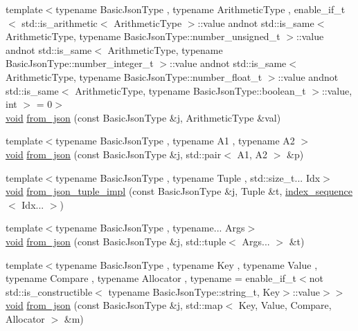 \begin{DoxyCompactItemize}
{\footnotesize template$<$typename Basic\+Json\+Type , typename Arithmetic\+Type , enable\+\_\+if\+\_\+t$<$ std\+::is\+\_\+arithmetic$<$ Arithmetic\+Type $>$\+::value andnot std\+::is\+\_\+same$<$ Arithmetic\+Type, typename Basic\+Json\+Type\+::number\+\_\+unsigned\+\_\+t $>$\+::value andnot std\+::is\+\_\+same$<$ Arithmetic\+Type, typename Basic\+Json\+Type\+::number\+\_\+integer\+\_\+t $>$\+::value andnot std\+::is\+\_\+same$<$ Arithmetic\+Type, typename Basic\+Json\+Type\+::number\+\_\+float\+\_\+t $>$\+::value andnot std\+::is\+\_\+same$<$ Arithmetic\+Type, typename Basic\+Json\+Type\+::boolean\+\_\+t $>$\+::value, int $>$  = 0$>$ }\\\hyperlink{namespacenlohmann_1_1detail_a59fca69799f6b9e366710cb9043aa77d}{void} \hyperlink{namespacenlohmann_1_1detail_a839b0ab50d2c9bce669068f56bc41202}{from\+\_\+json} (const Basic\+Json\+Type \&j, Arithmetic\+Type \&val)
\item 
{\footnotesize template$<$typename Basic\+Json\+Type , typename A1 , typename A2 $>$ }\\\hyperlink{namespacenlohmann_1_1detail_a59fca69799f6b9e366710cb9043aa77d}{void} \hyperlink{namespacenlohmann_1_1detail_aae9f9c2601074e323d49428132cc293d}{from\+\_\+json} (const Basic\+Json\+Type \&j, std\+::pair$<$ A1, A2 $>$ \&p)
\item 
{\footnotesize template$<$typename Basic\+Json\+Type , typename Tuple , std\+::size\+\_\+t... Idx$>$ }\\\hyperlink{namespacenlohmann_1_1detail_a59fca69799f6b9e366710cb9043aa77d}{void} \hyperlink{namespacenlohmann_1_1detail_a28253915d9db4a0112d60eaee0422949}{from\+\_\+json\+\_\+tuple\+\_\+impl} (const Basic\+Json\+Type \&j, Tuple \&t, \hyperlink{structnlohmann_1_1detail_1_1index__sequence}{index\+\_\+sequence}$<$ Idx... $>$)
\item 
{\footnotesize template$<$typename Basic\+Json\+Type , typename... Args$>$ }\\\hyperlink{namespacenlohmann_1_1detail_a59fca69799f6b9e366710cb9043aa77d}{void} \hyperlink{namespacenlohmann_1_1detail_a8b99ec9b29f3f20a18fc4281fb784e49}{from\+\_\+json} (const Basic\+Json\+Type \&j, std\+::tuple$<$ Args... $>$ \&t)
\item 
{\footnotesize template$<$typename Basic\+Json\+Type , typename Key , typename Value , typename Compare , typename Allocator , typename  = enable\+\_\+if\+\_\+t$<$not std\+::is\+\_\+constructible$<$                                     typename Basic\+Json\+Type\+::string\+\_\+t, Key$>$\+::value$>$$>$ }\\\hyperlink{namespacenlohmann_1_1detail_a59fca69799f6b9e366710cb9043aa77d}{void} \hyperlink{namespacenlohmann_1_1detail_ae93147a54d2740228ef16a5e6210ca3e}{from\+\_\+json} (const Basic\+Json\+Type \&j, std\+::map$<$ Key, Value, Compare, Allocator $>$ \&m)

\end{DoxyCompactItemize}
